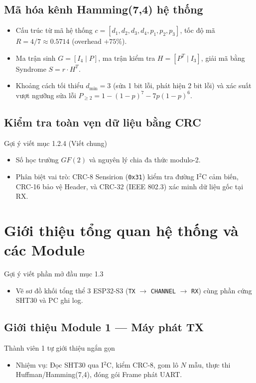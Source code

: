\documentclass[12pt,a4paper]{report}
\begin{document}
\subsection{Mã hóa kênh Hamming(7,4) hệ thống}
\begin{itemize}[leftmargin=*,nosep]
    \item Cấu trúc từ mã hệ thống $c = [d_1, d_2, d_3, d_4, p_1, p_2, p_3]$, tốc độ mã $R = 4/7 \approx 0.5714$ (overhead $+75\%$).
    \item Ma trận sinh $G = [I_4 \mid P]$, ma trận kiểm tra $H = [P^T \mid I_3]$, giải mã bằng Syndrome $S = r \cdot H^T$.
    \item Khoảng cách tối thiểu $d_{\min} = 3$ (sửa 1 bit lỗi, phát hiện 2 bit lỗi) và xác suất vượt ngưỡng sửa lỗi $P_{\ge 2} = 1 - (1-p)^7 - 7p(1-p)^6$.
\end{itemize}

\subsection{Kiểm tra toàn vẹn dữ liệu bằng CRC}
\begin{notebox}{Gợi ý viết mục 1.2.4 (Viết chung)}
\begin{itemize}[leftmargin=*,nosep]
    \item Số học trường $GF(2)$ và nguyên lý chia đa thức modulo-2.
    \item Phân biệt vai trò: CRC-8 Sensirion (\texttt{0x31}) kiểm tra đường I$^2$C cảm biến, CRC-16 bảo vệ Header, và CRC-32 (IEEE 802.3) xác minh dữ liệu gốc tại RX.
\end{itemize}
\end{notebox}

\section{Giới thiệu tổng quan hệ thống và các Module}
\begin{notebox}{Gợi ý viết phần mở đầu mục 1.3}
\begin{itemize}[leftmargin=*,nosep]
    \item Vẽ sơ đồ khối tổng thể 3 ESP32-S3 (\texttt{TX} $\rightarrow$ \texttt{CHANNEL} $\rightarrow$ \texttt{RX}) cùng phần cứng SHT30 và PC ghi log.
\end{itemize}
\end{notebox}

\subsection{Giới thiệu Module 1 --- Máy phát TX}
\begin{notebox}{Thành viên 1 tự giới thiệu ngắn gọn}
\begin{itemize}[leftmargin=*,nosep]
    \item Nhiệm vụ: Đọc SHT30 qua I$^2$C, kiểm CRC-8, gom lô $N$ mẫu, thực thi Huffman/Hamming(7,4), đóng gói Frame phát UART.
\end{itemize}
\end{notebox}
\end{document}
